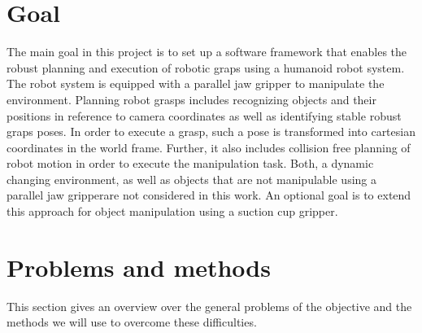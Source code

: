 \documentclass[a4paper]{article}
\begin{document}
\section{Goal} 
\label{2sec_goal}
The main goal in this project is to set up a software framework  that enables the robust planning and execution of robotic graps using a humanoid robot system.
The robot system is equipped with a parallel jaw gripper to manipulate the environment. Planning robot grasps includes recognizing objects and their positions in reference to camera coordinates as well as identifying stable robust graps poses.
In order to execute a grasp, such a pose is transformed into cartesian coordinates in the world frame.
Further, it also includes collision free planning of robot motion in order to execute the manipulation task.
Both, a dynamic changing environment, as well as objects that are not manipulable using a parallel jaw gripperare not considered in this work. 
An optional goal is to extend this approach for object manipulation using a suction cup gripper.

\section{Problems and methods}
\label{3sec_prob_n_meth}
This section gives an overview over the general problems of the objective and the methods we will use to overcome these difficulties.
\end{document}
